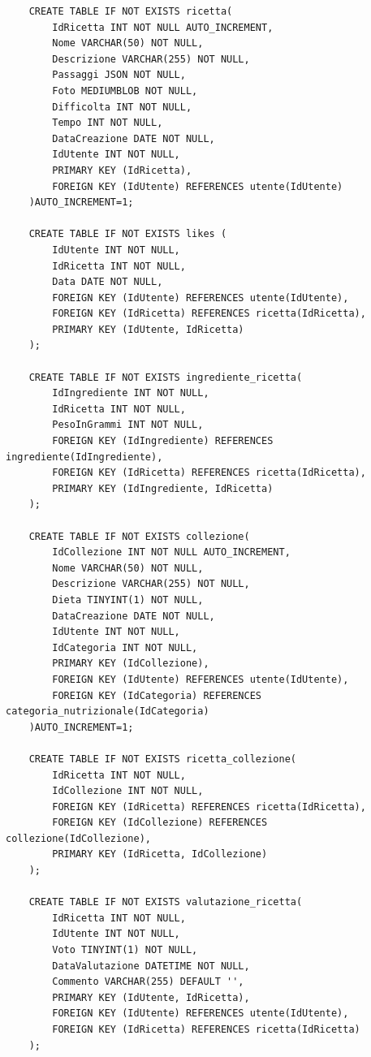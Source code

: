 ﻿\documentclass[a4paper,12pt]{report}
\begin{document}
\begin{verbatim}
    CREATE TABLE IF NOT EXISTS ricetta(
        IdRicetta INT NOT NULL AUTO_INCREMENT,
        Nome VARCHAR(50) NOT NULL,
        Descrizione VARCHAR(255) NOT NULL,
        Passaggi JSON NOT NULL,
        Foto MEDIUMBLOB NOT NULL,
        Difficolta INT NOT NULL,
        Tempo INT NOT NULL,
        DataCreazione DATE NOT NULL,
        IdUtente INT NOT NULL,
        PRIMARY KEY (IdRicetta),
        FOREIGN KEY (IdUtente) REFERENCES utente(IdUtente)
    )AUTO_INCREMENT=1;
    
    CREATE TABLE IF NOT EXISTS likes (
        IdUtente INT NOT NULL,
        IdRicetta INT NOT NULL,
        Data DATE NOT NULL,
        FOREIGN KEY (IdUtente) REFERENCES utente(IdUtente),
        FOREIGN KEY (IdRicetta) REFERENCES ricetta(IdRicetta),
        PRIMARY KEY (IdUtente, IdRicetta)
    );
    
    CREATE TABLE IF NOT EXISTS ingrediente_ricetta(
        IdIngrediente INT NOT NULL,
        IdRicetta INT NOT NULL,
        PesoInGrammi INT NOT NULL,
        FOREIGN KEY (IdIngrediente) REFERENCES ingrediente(IdIngrediente),
        FOREIGN KEY (IdRicetta) REFERENCES ricetta(IdRicetta),
        PRIMARY KEY (IdIngrediente, IdRicetta)
    );
    
    CREATE TABLE IF NOT EXISTS collezione(
        IdCollezione INT NOT NULL AUTO_INCREMENT,
        Nome VARCHAR(50) NOT NULL,
        Descrizione VARCHAR(255) NOT NULL,
        Dieta TINYINT(1) NOT NULL,
        DataCreazione DATE NOT NULL,
        IdUtente INT NOT NULL,
        IdCategoria INT NOT NULL,
        PRIMARY KEY (IdCollezione),
        FOREIGN KEY (IdUtente) REFERENCES utente(IdUtente),
        FOREIGN KEY (IdCategoria) REFERENCES categoria_nutrizionale(IdCategoria)
    )AUTO_INCREMENT=1;
    
    CREATE TABLE IF NOT EXISTS ricetta_collezione(
        IdRicetta INT NOT NULL,
        IdCollezione INT NOT NULL,
        FOREIGN KEY (IdRicetta) REFERENCES ricetta(IdRicetta),
        FOREIGN KEY (IdCollezione) REFERENCES collezione(IdCollezione),
        PRIMARY KEY (IdRicetta, IdCollezione)
    );
    
    CREATE TABLE IF NOT EXISTS valutazione_ricetta(
        IdRicetta INT NOT NULL,
        IdUtente INT NOT NULL,
        Voto TINYINT(1) NOT NULL,
        DataValutazione DATETIME NOT NULL,
        Commento VARCHAR(255) DEFAULT '',
        PRIMARY KEY (IdUtente, IdRicetta),
        FOREIGN KEY (IdUtente) REFERENCES utente(IdUtente),
        FOREIGN KEY (IdRicetta) REFERENCES ricetta(IdRicetta)
    );
    

\end{verbatim}
\end{document}
